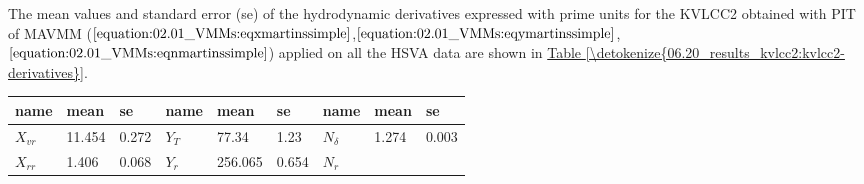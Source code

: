 \documentclass[review]{elsarticle}
\begin{document}
  
The mean values and standard error (se) of the hydrodynamic derivatives expressed with prime units for the KVLCC2 obtained with PIT of MAVMM (\(\autoref{equation:02.01_VMMs:eqxmartinssimple}\),\(\autoref{equation:02.01_VMMs:eqymartinssimple}\), \(\autoref{equation:02.01_VMMs:eqnmartinssimple}\)) applied on all the HSVA data are shown in \hyperref[\detokenize{06.20_results_kvlcc2:kvlcc2-derivatives}]{Table \ref{\detokenize{06.20_results_kvlcc2:kvlcc2-derivatives}}}.


 \begin{savenotes}\sphinxattablestart
 \centering
 \sphinxthecaptionisattop
 \label{\detokenize{06.20_results_kvlcc2:kvlcc2-derivatives}}
 \sphinxaftertopcaption
 \begin{tabulary}{\linewidth}[t]{|T|T|T|T|T|T|T|T|T|}
 \hline
 \sphinxstyletheadfamily 
 
 name
 &\sphinxstyletheadfamily 
 
 mean
 &\sphinxstyletheadfamily 
 
 se
 &\sphinxstyletheadfamily 
 
 name
 &\sphinxstyletheadfamily 
 
 mean
 &\sphinxstyletheadfamily 
 
 se
 &\sphinxstyletheadfamily 
 
 name
 &\sphinxstyletheadfamily 
 
 mean
 &\sphinxstyletheadfamily 
 
 se
 \\
 \hline
 
 \( X_{vr} \)
 &
 
 \sphinxhyphen{}11.454
 &
 
 0.272
 &
 
 \( Y_{T} \)
 &
 
 77.34
 &
 
 1.23
 &
 
 \( N_{\delta} \)
 &
 
 \sphinxhyphen{}1.274
 &
 
 0.003
 \\
 \hline
 
 \( X_{rr} \)
 &
 
 \sphinxhyphen{}1.406
 &
 
 0.068
 &
 
 \( Y_{r} \)
 &
 
 256.065
 &
 
 0.654
 &
 
 \( N_{r} \)
 &
 

\end{tabulary}
\end{savenotes}
\end{document}
